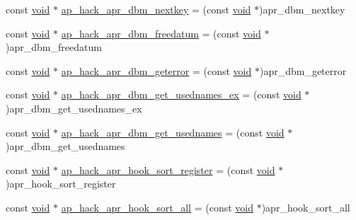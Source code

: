 \begin{DoxyCompactItemize}
\item 
const \hyperlink{group__MOD__ISAPI_gacd6cdbf73df3d9eed42fa493d9b621a6}{void} $\ast$ \hyperlink{srclib_2apr-util_2exports_8c_ac57ee44ddcb13b94de4a749c6d39f166}{ap\+\_\+hack\+\_\+apr\+\_\+dbm\+\_\+nextkey} = (const \hyperlink{group__MOD__ISAPI_gacd6cdbf73df3d9eed42fa493d9b621a6}{void} $\ast$)apr\+\_\+dbm\+\_\+nextkey
\item 
const \hyperlink{group__MOD__ISAPI_gacd6cdbf73df3d9eed42fa493d9b621a6}{void} $\ast$ \hyperlink{srclib_2apr-util_2exports_8c_a6b6645bb9c3eda0f6de16069b3c409f0}{ap\+\_\+hack\+\_\+apr\+\_\+dbm\+\_\+freedatum} = (const \hyperlink{group__MOD__ISAPI_gacd6cdbf73df3d9eed42fa493d9b621a6}{void} $\ast$)apr\+\_\+dbm\+\_\+freedatum
\item 
const \hyperlink{group__MOD__ISAPI_gacd6cdbf73df3d9eed42fa493d9b621a6}{void} $\ast$ \hyperlink{srclib_2apr-util_2exports_8c_ae227cea866f7f6c789c05dd172b811a4}{ap\+\_\+hack\+\_\+apr\+\_\+dbm\+\_\+geterror} = (const \hyperlink{group__MOD__ISAPI_gacd6cdbf73df3d9eed42fa493d9b621a6}{void} $\ast$)apr\+\_\+dbm\+\_\+geterror
\item 
const \hyperlink{group__MOD__ISAPI_gacd6cdbf73df3d9eed42fa493d9b621a6}{void} $\ast$ \hyperlink{srclib_2apr-util_2exports_8c_ab213547b48ea6f7a3a9bfd2a86c7d3b3}{ap\+\_\+hack\+\_\+apr\+\_\+dbm\+\_\+get\+\_\+usednames\+\_\+ex} = (const \hyperlink{group__MOD__ISAPI_gacd6cdbf73df3d9eed42fa493d9b621a6}{void} $\ast$)apr\+\_\+dbm\+\_\+get\+\_\+usednames\+\_\+ex
\item 
const \hyperlink{group__MOD__ISAPI_gacd6cdbf73df3d9eed42fa493d9b621a6}{void} $\ast$ \hyperlink{srclib_2apr-util_2exports_8c_aea67262cd45665001c72233097e2897b}{ap\+\_\+hack\+\_\+apr\+\_\+dbm\+\_\+get\+\_\+usednames} = (const \hyperlink{group__MOD__ISAPI_gacd6cdbf73df3d9eed42fa493d9b621a6}{void} $\ast$)apr\+\_\+dbm\+\_\+get\+\_\+usednames
\item 
const \hyperlink{group__MOD__ISAPI_gacd6cdbf73df3d9eed42fa493d9b621a6}{void} $\ast$ \hyperlink{srclib_2apr-util_2exports_8c_a72eefef5616ad858cc40187a0d5e708c}{ap\+\_\+hack\+\_\+apr\+\_\+hook\+\_\+sort\+\_\+register} = (const \hyperlink{group__MOD__ISAPI_gacd6cdbf73df3d9eed42fa493d9b621a6}{void} $\ast$)apr\+\_\+hook\+\_\+sort\+\_\+register
\item 
const \hyperlink{group__MOD__ISAPI_gacd6cdbf73df3d9eed42fa493d9b621a6}{void} $\ast$ \hyperlink{srclib_2apr-util_2exports_8c_a5e18b4b81f040e8f6645443098766b66}{ap\+\_\+hack\+\_\+apr\+\_\+hook\+\_\+sort\+\_\+all} = (const \hyperlink{group__MOD__ISAPI_gacd6cdbf73df3d9eed42fa493d9b621a6}{void} $\ast$)apr\+\_\+hook\+\_\+sort\+\_\+all

\end{DoxyCompactItemize}
